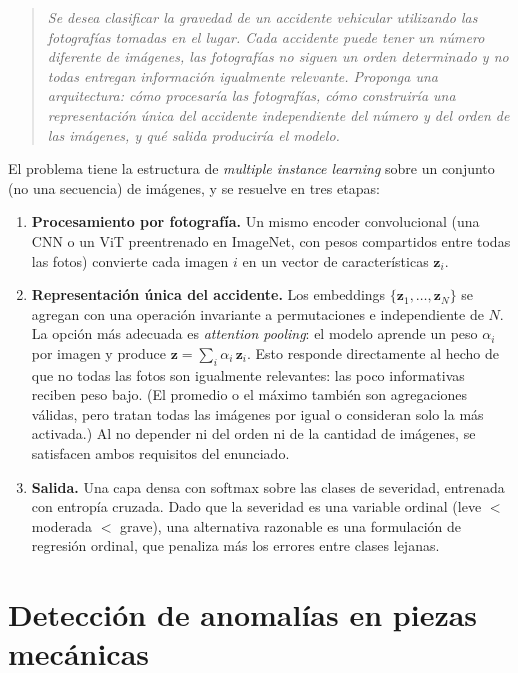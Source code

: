 \documentclass[12pt, a4paper]{article}
\newenvironment{enunciado}
  {\begin{quote}\itshape\color{black!75}}
  {\end{quote}}
\begin{document}
\begin{enunciado}
Se desea clasificar la gravedad de un accidente vehicular utilizando las fotografías tomadas
en el lugar. Cada accidente puede tener un número diferente de imágenes, las fotografías no
siguen un orden determinado y no todas entregan información igualmente relevante. Proponga
una arquitectura: cómo procesaría las fotografías, cómo construiría una representación única
del accidente independiente del número y del orden de las imágenes, y qué salida produciría
el modelo.
\end{enunciado}

El problema tiene la estructura de \emph{multiple instance learning} sobre un conjunto (no
una secuencia) de imágenes, y se resuelve en tres etapas:

\begin{enumerate}[leftmargin=2em]
  \item \textbf{Procesamiento por fotografía.} Un mismo encoder convolucional (una CNN o un
        ViT preentrenado en ImageNet, con pesos compartidos entre todas las fotos) convierte
        cada imagen $i$ en un vector de características $\mathbf{z}_i$.
  \item \textbf{Representación única del accidente.} Los embeddings
        $\{\mathbf{z}_1,\dots,\mathbf{z}_N\}$ se agregan con una operación invariante a
        permutaciones e independiente de $N$. La opción más adecuada es \emph{attention
        pooling}: el modelo aprende un peso $\alpha_i$ por imagen y produce
        $\mathbf{z} = \sum_i \alpha_i\,\mathbf{z}_i$. Esto responde directamente al hecho de
        que no todas las fotos son igualmente relevantes: las poco informativas reciben peso
        bajo. (El promedio o el máximo también son agregaciones válidas, pero tratan todas
        las imágenes por igual o consideran solo la más activada.) Al no depender ni del
        orden ni de la cantidad de imágenes, se satisfacen ambos requisitos del enunciado.
  \item \textbf{Salida.} Una capa densa con softmax sobre las clases de severidad, entrenada
        con entropía cruzada. Dado que la severidad es una variable ordinal (leve $<$
        moderada $<$ grave), una alternativa razonable es una formulación de regresión
        ordinal, que penaliza más los errores entre clases lejanas.
\end{enumerate}

\section{Detección de anomalías en piezas mecánicas}
\end{document}
